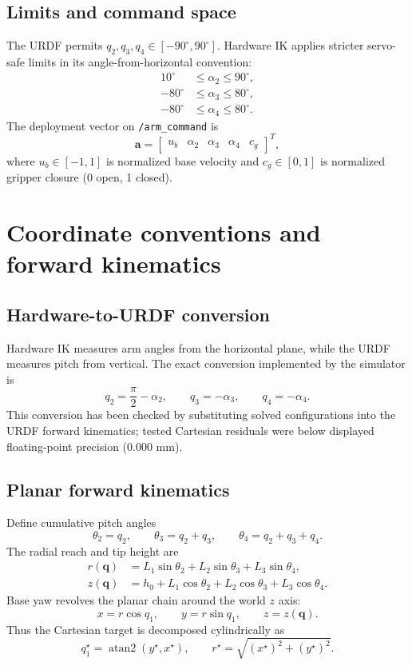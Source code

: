 \documentclass[11pt,a4paper]{article}
\newcommand{\vect}[1]{\bm{#1}}
\newcommand{\code}[1]{\texttt{#1}}
\begin{document}
\subsection{Limits and command space}
The URDF permits $q_2,q_3,q_4\in[-90^\circ,90^\circ]$. Hardware IK applies
stricter servo-safe limits in its angle-from-horizontal convention:
\begin{align*}
10^\circ&\leq \alpha_2\leq90^\circ,\\
-80^\circ&\leq \alpha_3\leq80^\circ,\\
-80^\circ&\leq \alpha_4\leq80^\circ.
\end{align*}
The deployment vector on \code{/arm\_command} is
\[
\vect a=\begin{bmatrix}u_b&\alpha_2&\alpha_3&\alpha_4&c_g\end{bmatrix}^{T},
\]
where $u_b\in[-1,1]$ is normalized base velocity and $c_g\in[0,1]$ is
normalized gripper closure (0 open, 1 closed).

\section{Coordinate conventions and forward kinematics}

\subsection{Hardware-to-URDF conversion}
Hardware IK measures arm angles from the horizontal plane, while the URDF
measures pitch from vertical. The exact conversion implemented by the simulator is
\begin{equation}
\boxed{
q_2=\frac{\pi}{2}-\alpha_2,\qquad
q_3=-\alpha_3,\qquad
q_4=-\alpha_4.}
\label{eq:conversion}
\end{equation}
This conversion has been checked by substituting solved configurations into the
URDF forward kinematics; tested Cartesian residuals were below displayed
floating-point precision ($0.000$ mm).

\subsection{Planar forward kinematics}
Define cumulative pitch angles
\[
\theta_2=q_2,\qquad \theta_3=q_2+q_3,\qquad
\theta_4=q_2+q_3+q_4.
\]
The radial reach and tip height are
\begin{align}
r(\vect q)&=L_1\sin\theta_2+L_2\sin\theta_3+L_3\sin\theta_4,\\
z(\vect q)&=h_0+L_1\cos\theta_2+L_2\cos\theta_3+L_3\cos\theta_4.
\end{align}
Base yaw revolves the planar chain around the world $z$ axis:
\begin{equation}
\boxed{
x=r\cos q_1,\qquad y=r\sin q_1,\qquad z=z(\vect q).}
\label{eq:fk}
\end{equation}
Thus the Cartesian target is decomposed cylindrically as
\[
q_1^{\star}=\operatorname{atan2}(y^{\star},x^{\star}),\qquad
r^{\star}=\sqrt{(x^{\star})^2+(y^{\star})^2}.
\]
\end{document}
